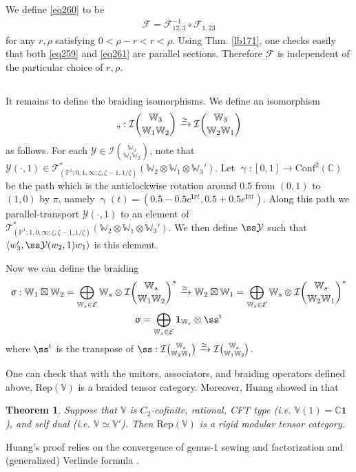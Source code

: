 \documentclass[12pt,a4paper,notitlepage]{article}
\theoremstyle{definition}
\theoremstyle{plain}
\newtheorem{thm}[df]{Theorem}
\newcommand{\mc}{\mathcal}
\newcommand{\tr}{\mathrm{t}} %
\newcommand{\id}{\mathbf{1}}
\newcommand{\Conf}{\mathrm{Conf}}
\newcommand{\Rep}{\mathrm{Rep}}
\newcommand{\bk}[1]{\langle {#1}\rangle}
\newcommand{\scr}{\mathscr}
\newcommand{\im}{\mathbf{i}}
\newcommand{\Vbb}{\mathbb V}
\newcommand{\Wbb}{\mathbb W}
\newcommand{\Cbb}{\mathbb C}
\newcommand{\Pbb}{\mathbb P}
\numberwithin{equation}{section}
\begin{document}
We define \eqref{eq260} to be
\begin{align}
\mc F=\mc F_{12,3}^{-1}\circ\mc F_{1,23}
\end{align}
for any $r,\rho$ satisfying $0<\rho-r<r<\rho$. Using Thm. \ref{lb171}, one checks easily that both \eqref{eq259} and \eqref{eq261} are parallel sections. Therefore $\mc F$ is independent of the particular choice of $r,\rho$. 

\subsection{}\label{lb187}

It remains to define the braiding isomorphisms. We define an isomorphism
\begin{align}
\ss:\mc I{\Wbb_3\choose \Wbb_1\Wbb_2}\xrightarrow{\simeq}\mc I{\Wbb_3\choose \Wbb_2\Wbb_1}
\end{align}
as follows. For each $\mc Y\in\mc I{\Wbb_3\choose \Wbb_1\Wbb_2}$, note that $\mc Y(\cdot,1)\in\scr T_{(\Pbb^1;0,1,\infty;\zeta,\zeta-1,1/\zeta)}^*(\Wbb_2\otimes\Wbb_1\otimes\Wbb_3')$. Let  $\upgamma:[0,1]\rightarrow\Conf^2(\Cbb)$ be the path which is the anticlockwise rotation around $0.5$ from $(0,1)$ to $(1,0)$ by $\pi$, namely $\upgamma(t)=(0.5-0.5e^{\im\pi t},0.5+0.5e^{\im\pi t})$. Along this path we parallel-transport $\mc Y(\cdot,1)$ to an element of $\scr T_{(\Pbb^1;1,0,\infty;\zeta,\zeta-1,1/\zeta)}^*(\Wbb_2\otimes\Wbb_1\otimes\Wbb_3')$. We then define $\ss\mc Y$ such that $\bk{w_3',\ss\mc Y(w_2,1)w_1}$ is this element.

Now we can define the braiding 
\begin{gather}
\begin{gathered}
\upsigma:\Wbb_1\boxtimes\Wbb_2=\bigoplus_{\Wbb_s\in\mc E}\Wbb_s\otimes\mc I{\Wbb_s\choose \Wbb_1\Wbb_2}^*\xrightarrow{\simeq}\Wbb_2\boxtimes\Wbb_1=\bigoplus_{\Wbb_s\in\mc E}\Wbb_s\otimes\mc I{\Wbb_s\choose \Wbb_2\Wbb_1}^*\\
\upsigma=\bigoplus_{\Wbb_s\in\mc E}\id_{\Wbb_s}\otimes \ss^\tr
\end{gathered}
\end{gather}
where $\ss^\tr$ is the transpose of $\ss:\mc I{\Wbb_s\choose \Wbb_2\Wbb_1}\xrightarrow{\simeq}\mc I{\Wbb_s\choose \Wbb_1\Wbb_2}$.

One can check that with the unitors, associators, and braiding operators defined above, $\Rep(\Vbb)$ is a braided tensor category. Moreover, Huang showed in \cite{Hua08b} that
\begin{thm}
Suppose that $\Vbb$ is $C_2$-cofinite, rational, CFT type (i.e. $\Vbb(1)=\Cbb\id$), and self dual (i.e. $\Vbb\simeq\Vbb'$). Then $\Rep(\Vbb)$ is a rigid modular tensor category.
\end{thm}
Huang's proof relies on the convergence of genus-$1$ sewing and factorization \cite{Zhu96,Hua05} and (generalized) Verlinde formula \cite{Hua08a}. 
\end{document}
